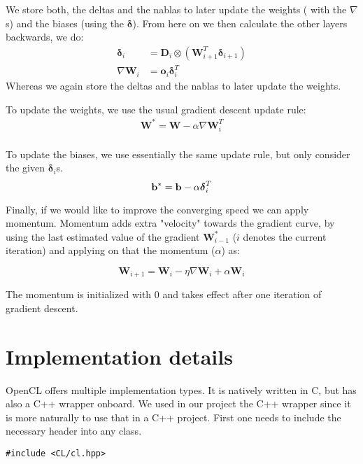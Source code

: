 \documentclass{acm_proc_article-sp}
\begin{document}
We store both, the deltas and the nablas to later update the weights ( with the $\nabla$s) and the biases (using the $\mathbf{\delta}$).
From here on we then calculate the other layers backwards, we do:
\begin{align}
\boldsymbol{\delta}_i &= \mathbf{D}_i \otimes \left( \mathbf{W}_{i+1}^T \boldsymbol{\delta}_{i+1} \right)\\
\nabla \mathbf{W}_i &= \mathbf{o}_i \boldsymbol{\delta}_i^T
\end{align}
Whereas we again store the deltas and the nablas to later update the weights.

To update the weights, we use the usual gradient descent update rule:
\begin{align}
\mathbf{W}^{*} = \mathbf{W} - \alpha \nabla \mathbf{W}_i^T\\
\end{align}

To update the biases, we use essentially the same update rule, but only consider the given $\boldsymbol{\delta}_{i}$s.
\begin{equation}
\mathbf{b}^{*} = \mathbf{b} - \alpha \boldsymbol{\delta}_i^T\\
\end{equation}

Finally, if we would like to improve the converging speed we can apply momentum. Momentum adds extra "velocity" towards the gradient curve, by using the last estimated value of the gradient $\mathbf{W}^{*}_{i-1}$ ($i$ denotes the current iteration) and applying on that the momentum ($ \alpha$) as:

\begin{equation}
\mathbf{W}_{i+1} = \mathbf{W}_i - \eta \nabla \mathbf{W}_i + \alpha \mathbf{W}_i
\end{equation}

The momentum is initialized with 0 and takes effect after one iteration of gradient descent.

\section{Implementation details}

OpenCL offers multiple implementation types. It is natively written in C, but has also a C++ wrapper onboard. We used in our project the C++ wrapper since it is more naturally to use that in a C++ project.
First one needs to include the necessary header into any class.

\begin{lstlisting}[caption=OpenCL C++ header]
#include <CL/cl.hpp>
\end{lstlisting}
\end{document}
